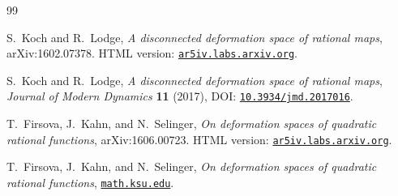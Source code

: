 \documentclass[11pt]{article}
\theoremstyle{definition}
\theoremstyle{remark}
\begin{document}
\begin{thebibliography}{99}

S.~Koch and R.~Lodge,
\emph{A disconnected deformation space of rational maps},
arXiv:1602.07378.
HTML version:
\href{https://ar5iv.labs.arxiv.org/html/1602.07378}%
{\texttt{ar5iv.labs.arxiv.org}}.

S.~Koch and R.~Lodge,
\emph{A disconnected deformation space of rational maps},
\emph{Journal of Modern Dynamics} \textbf{11} (2017),
DOI: \href{https://www.aimsciences.org/article/doi/10.3934/jmd.2017016}%
{\texttt{10.3934/jmd.2017016}}.

T.~Firsova, J.~Kahn, and N.~Selinger,
\emph{On deformation spaces of quadratic rational functions},
arXiv:1606.00723.
HTML version:
\href{https://ar5iv.labs.arxiv.org/html/1606.00723}%
{\texttt{ar5iv.labs.arxiv.org}}.

T.~Firsova, J.~Kahn, and N.~Selinger,
\emph{On deformation spaces of quadratic rational functions},
\href{https://www.math.ksu.edu/~tanyaf/FKS.pdf}{\texttt{math.ksu.edu}}.

\end{thebibliography}
\end{document}
